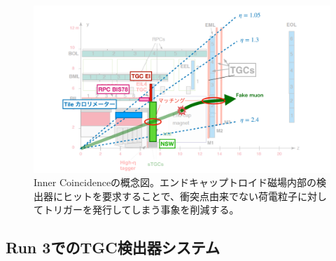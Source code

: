 \begin{figure} 
    \centering
    \includegraphics[width=16cm]{fig/Intro/TGC_Inner_concept.pdf}
    \caption[フェイクトリガーの例]{Inner Coincidenceの概念図\cite{mt_kawamoto}。エンドキャップトロイド磁場内部の検出器にヒットを要求することで、衝突点由来でない荷電粒子に対してトリガーを発行してしまう事象を削減する。}
    \label{TGC_Inner_concept}
\end{figure}

    \subsection{Run 3でのTGC検出器システム}

